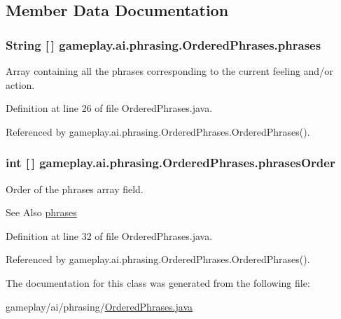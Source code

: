 \subsection{Member Data Documentation}
\hypertarget{a00016_ad31c26f17c9c223ae5a4260a77e60729}{
\subsubsection[{phrases}]{\setlength{\rightskip}{0pt plus 5cm}String \mbox{[}$\,$\mbox{]} gameplay.\-ai.\-phrasing.\-Ordered\-Phrases.\-phrases\hspace{0.3cm}{\ttfamily [protected]}}}\label{a00016_ad31c26f17c9c223ae5a4260a77e60729}


Array containing all the phrases corresponding to the current feeling and/or action. 



Definition at line 26 of file Ordered\-Phrases.\-java.



Referenced by gameplay.\-ai.\-phrasing.\-Ordered\-Phrases.\-Ordered\-Phrases().

\hypertarget{a00016_a8494c96fae41b483dc07c1d513da779e}{
\subsubsection[{phrases\-Order}]{\setlength{\rightskip}{0pt plus 5cm}int \mbox{[}$\,$\mbox{]} gameplay.\-ai.\-phrasing.\-Ordered\-Phrases.\-phrases\-Order\hspace{0.3cm}{\ttfamily [protected]}}}\label{a00016_a8494c96fae41b483dc07c1d513da779e}


Order of the phrases array field. 

\begin{DoxySeeAlso}{See Also}
\hyperlink{a00016_ad31c26f17c9c223ae5a4260a77e60729}{phrases} 
\end{DoxySeeAlso}


Definition at line 32 of file Ordered\-Phrases.\-java.



Referenced by gameplay.\-ai.\-phrasing.\-Ordered\-Phrases.\-Ordered\-Phrases().



The documentation for this class was generated from the following file\-:\begin{DoxyCompactItemize}
\item 
gameplay/ai/phrasing/\hyperlink{a00049}{Ordered\-Phrases.\-java}\end{DoxyCompactItemize}

